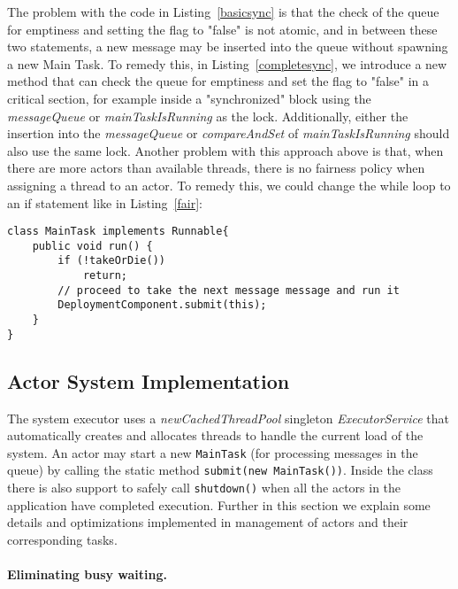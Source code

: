 The problem with the code in Listing~\ref{basicsync} is that the check of the queue for emptiness and setting the flag to "false" is not atomic, and in between these two statements, a new message may be inserted into the queue without spawning a new Main Task. To remedy this, in Listing~\ref{completesync}, we introduce a new method that can check the queue for emptiness and set the flag to "false" in a critical section, for example inside a "synchronized" block using the \textit{messageQueue} or \textit{mainTaskIsRunning} as the lock. Additionally, either the insertion into the \textit{messageQueue} or \textit{compareAndSet} of \textit{mainTaskIsRunning} should also use the same lock.  Another problem with this approach above is that, when there are more actors than available threads, there is no fairness policy when assigning a thread to an actor. To remedy this, we could change the while loop to an if statement like in Listing~\ref{fair}: 
\begin{lstlisting}[caption= Fairness Between Actors, label=fair]
class MainTask implements Runnable{
	public void run() {
		if (!takeOrDie())
			return;
		// proceed to take the next message message and run it	 
		DeploymentComponent.submit(this);
	}	
}
\end{lstlisting}



\subsection{Actor System Implementation}

The system executor uses a \textit{newCachedThreadPool} singleton \textit{ExecutorService} that automatically creates and allocates threads to handle the current load of the system. 
An actor may start a new \lstinline"MainTask" (for processing messages in the queue) by  calling the static method \lstinline|submit(new MainTask())|. 
Inside the class there is also support to safely call \lstinline|shutdown()| when all the actors in the application have completed execution. 
Further in this section we explain some details and optimizations implemented in management of actors and their corresponding tasks.


\paragraph{Eliminating busy waiting.}


